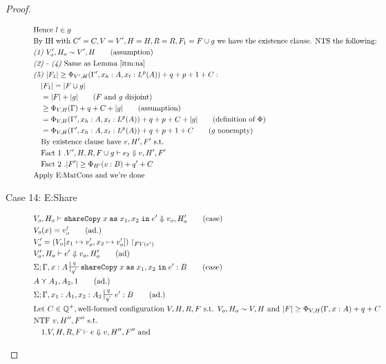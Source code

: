 \documentclass[11pt]{article}
\newcommand{\irl}[1]{\mathtt{#1}}
\newcommand{\sharecpcst}[4]{\irl{shareCopy}\;#1\;\irl{as}\;#2,#3\;\irl{in}\;#4}
\theoremstyle{definition}
\begin{document}
\begin{proof}
\begin{description}
\begin{align*}
  &\text{Hence } l \in g\\
	&\text{By IH with } C' = C, V = V', H = H, R = R, F_1 = F \cup g 
		\text{ we have the existence clause. NTS the following: } \\
	&\emph{(1) } V_o',H_o \sim V',H \tag{assumption} \\
	&\emph{(2) - (4) } \text{Same as Lemma~\ref{itm:na}}\\
		&\emph{(5) } |F_1| \ge \Phi_{V',H}(\Gamma',x_h:A,x_t:L^p(A)) + q + p + 1 + C:\\
	&\quad |F_1| = |F \cup g|\\
	&\quad = |F| + |g| \tag{$F$ and $g$ disjoint}\\
	&\quad \ge \Phi_{V,H}(\Gamma) + q + C + |g| \tag{assumption}\\
		&\quad = \Phi_{V,H}(\Gamma',x_h:A,x_t:L^p(A)) + q+ p + C + |g| \tag{definition of $\Phi$}\\
	&\quad = \Phi_{V,H}(\Gamma',x_h:A,x_t:L^p(A)) + q + p + 1 + C \tag{$g$ nonempty}\\
		&\quad\text{By existence clause have } v,H',F' \text{ s.t. }\\
		&\quad \text{Fact 1 }. V',H,R,F\cup g \vdash e_2 \Downarrow v,H',F'\\
		&\quad \text{Fact 2 }. |F'| \ge \Phi_{H'}(v:B) + q' + C\\
	&\text{Apply E:MatCons and we're done}
  \end{align*}
  \item[Case 14: E:Share]
	\begin{align*}
	&V_o,H_o \vdash \sharecpcst{x}{x_1}{x_2}{e'}  \Downarrow v_o,H_o' \tag{case}\\
	&V_o(x) = v_o' \tag{ad.}\\
	&V_o' = (V_o[x_1 \mapsto v_o',x_2 \mapsto v_o']) \restriction_{FV(e')}\\
	&V_o', H_o \vdash e' \Downarrow v_o,H_o' \tag{ad}\\
	&\Sigma;\Gamma,x:A \sststile{q'}{q} \sharecpcst{x}{x_1}{x_2}{e'}: B \tag{case}\\
	&A \curlyvee A_1,A_2,1 \tag{ad.}\\
	&\Sigma; \Gamma,x_1:A_1,x_2:A_2 \sststile{q'}{q} e' : B \tag{ad.}\\
&\text{Let } C \in \mathbb{Q}^+, \text{well-formed configuration } V,H,R,F \text{ s.t. }
		V_o,H_o \sim V,H
			\text{ and }|F| \ge \Phi_{V,H}(\Gamma,x:A) + q + C\\
  &\text{NTF } v,H'',F'' \text{ s.t. }\\
	&\quad 1. V,H,R,F \vdash e \Downarrow v, H'',F'' \text{ and }\\ 

\end{align*}
\end{description}
\end{proof}
\end{document}
